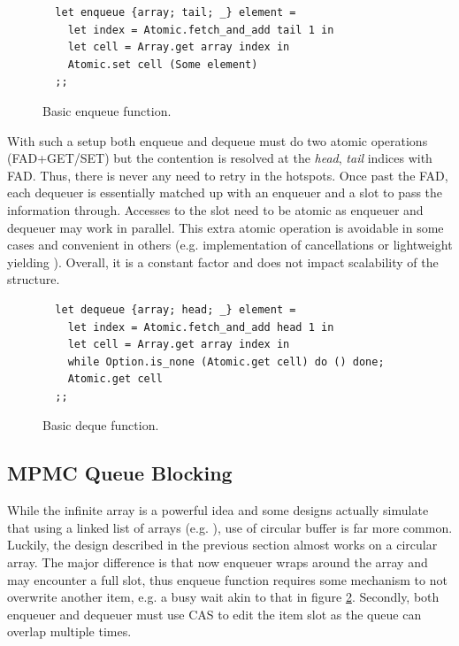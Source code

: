 \documentclass[12pt,a4paper,twoside]{report}
\begin{document}
\begin{figure}
    \centering
    \begin{verbatim}
  let enqueue {array; tail; _} element = 
    let index = Atomic.fetch_and_add tail 1 in
    let cell = Array.get array index in 
    Atomic.set cell (Some element)
  ;;
    \end{verbatim}
    \caption{Basic enqueue function.}
    \label{fig:basic-enqueue}
\end{figure}


With such a setup both enqueue and dequeue must do two atomic operations (FAD+GET/SET) but the contention is resolved at the \textit{head}, \textit{tail} indices with FAD. Thus, there is never any need to retry in the hotspots. Once past the FAD, each dequeuer is essentially matched up with an enqueuer and a slot to pass the information through. Accesses to the slot need to be atomic as enqueuer and dequeuer may work in parallel. This extra atomic operation is avoidable in some cases and convenient in others (e.g. implementation of cancellations or lightweight yielding ). Overall, it is a constant factor and does not impact scalability of the structure.


\begin{figure}
    \centering
    \begin{verbatim}
  let dequeue {array; head; _} element = 
    let index = Atomic.fetch_and_add head 1 in
    let cell = Array.get array index in 
    while Option.is_none (Atomic.get cell) do () done;
    Atomic.get cell
  ;;
    \end{verbatim}
    \caption{Basic deque function.}
    \label{fig:basic-deque}
\end{figure}

\subsection{MPMC Queue Blocking}

While the infinite array is a powerful idea and some designs actually simulate that using a linked list of arrays (e.g. \cite{Sundell2011}), use of circular buffer is far more common. Luckily, the design described in the previous section almost works on a circular array. The major difference is that now enqueuer wraps around the array and may encounter a full slot, thus enqueue function requires some mechanism to not overwrite another item, e.g. a busy wait akin to that in figure \ref{fig:basic-deque}. Secondly, both enqueuer and dequeuer must use CAS to edit the item slot as the queue can overlap multiple times. 
\end{document}
